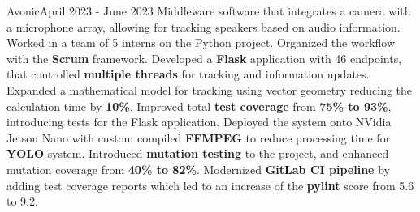     {Avonic}{April 2023 - June 2023}
    \vspace{6pt}
    \scriptsize { \small{\newline{} Middleware software that integrates a camera with a microphone array, allowing for tracking speakers based on audio information.}}
    \vspace{-4pt}
    \resumeItemListStart
        \subItemOfItem
            {Worked in a team of 5 interns on the Python project. Organized the workflow with the \textbf{Scrum} framework.}
         \subItemOfItem
            {Developed a \textbf{Flask} application with 46 endpoints, that controlled \textbf{multiple threads} for tracking and information updates.}
        \subItemOfItem
            {Expanded a mathematical model for tracking using vector geometry reducing the calculation time by \textbf{10\%}.}
        \subItemOfItem
            {Improved total \textbf{test coverage} from \textbf{75\% to 93\%}, introducing tests for the Flask application.}
        \subItemOfItem
            {Deployed the system onto NVidia Jetson Nano with custom compiled \textbf{FFMPEG} to reduce processing time for \textbf{YOLO} system.}
        \subItemOfItem
            {Introduced \textbf{mutation testing} to the project, and enhanced mutation coverage from \textbf{40\% to 82\%}.}
        \subItemOfItem
            {Modernized \textbf{GitLab CI pipeline} by adding test coverage reports which led to an increase of the \textbf{pylint} score from 5.6 to 9.2.}
      \resumeItemListEnd